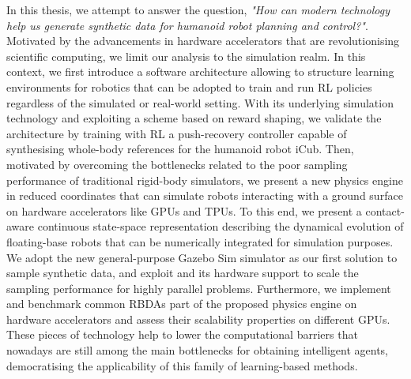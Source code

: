 In this thesis, we attempt to answer the question,
\textit{"How can modern technology help us generate synthetic data for humanoid robot planning and control?"}.\linebreak
Motivated by the advancements in hardware accelerators that are revolutionising scientific computing, we limit our analysis to the simulation realm.\linebreak
In this context, we first introduce a software architecture allowing to structure learning environments for robotics that can be adopted to train and run \ac{RL} policies regardless of the simulated or real-world setting.
With its underlying simulation technology and exploiting a scheme based on reward shaping, we validate the architecture by
training with \ac{RL} a push-recovery controller capable of synthesising whole-body references for the humanoid robot iCub.
Then, motivated by overcoming the bottlenecks related to the poor sampling performance of traditional rigid-body simulators, we present a new physics engine in reduced coordinates that can simulate robots interacting with a ground surface on hardware accelerators like \acp{GPU} and \acp{TPU}.
To this end, we present a contact-aware continuous state-space representation describing the dynamical evolution of floating-base robots that can be numerically integrated for simulation purposes.
We adopt the new general-purpose Gazebo Sim simulator as our first solution to sample synthetic data, and exploit \jax and its hardware support to scale the sampling performance for highly parallel problems.
Furthermore, we implement and benchmark common \acp{RBDA} part of the proposed physics engine on hardware accelerators and assess their scalability properties on different \acp{GPU}.
These pieces of technology help to lower the computational barriers that nowadays are still among the main bottlenecks for obtaining intelligent agents, democratising the applicability of this family of learning-based methods.

\vfill

\endgroup

\vfill
